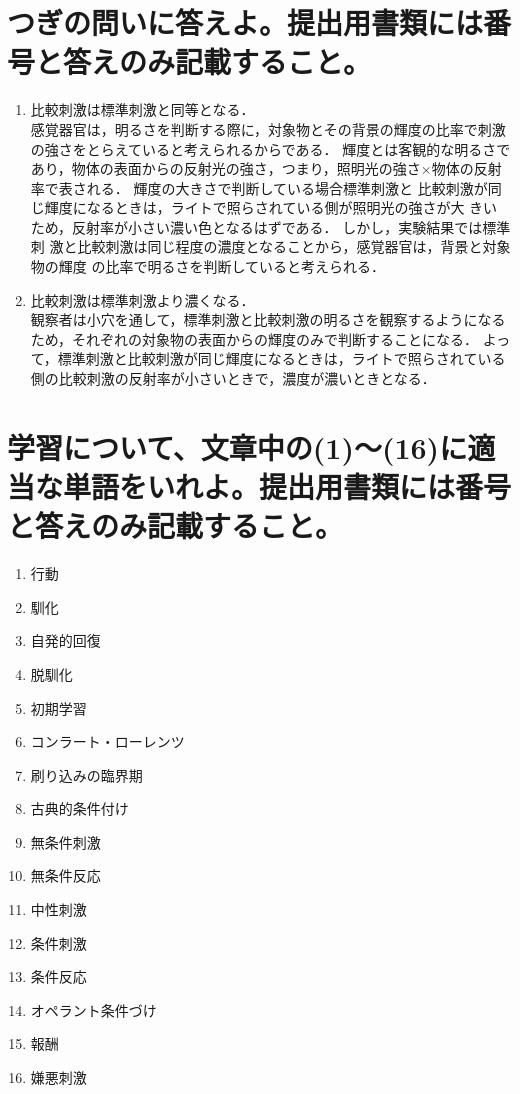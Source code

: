 \documentclass[titlepage,a4paper]{jsarticle}
\begin{document}
\section{つぎの問いに答えよ。提出用書類には番号と答えのみ記載すること。}%
\begin{enumerate}
  \item 比較刺激は標準刺激と同等となる． \\
        感覚器官は，明るさを判断する際に，対象物とその背景の輝度の比率で刺激の強さをとらえていると考えられるからである．
        輝度とは客観的な明るさであり，物体の表面からの反射光の強さ，つまり，照明光の強さ×物体の反射率で表される．
        輝度の大きさで判断している場合標準刺激と 比較刺激が同じ輝度になるときは，ライトで照らされている側が照明光の強さが大 きいため，反射率が小さい濃い色となるはずである．
        しかし，実験結果では標準刺 激と比較刺激は同じ程度の濃度となることから，感覚器官は，背景と対象物の輝度 の比率で明るさを判断していると考えられる．
  \item 比較刺激は標準刺激より濃くなる． \\
        観察者は小穴を通して，標準刺激と比較刺激の明るさを観察するようになるため，それぞれの対象物の表面からの輝度のみで判断することになる．
        よって，標準刺激と比較刺激が同じ輝度になるときは，ライトで照らされている側の比較刺激の反射率が小さいときで，濃度が濃いときとなる．
\end{enumerate}
\section{学習について、文章中の(1)〜(16)に適当な単語をいれよ。提出用書類には番号と答えのみ記載すること。}%
\begin{enumerate}
  \item 行動
  \item 馴化
  \item 自発的回復
  \item 脱馴化
  \item 初期学習
  \item コンラート・ローレンツ
  \item 刷り込みの臨界期
  \item 古典的条件付け
  \item 無条件刺激
  \item 無条件反応
  \item 中性刺激
  \item 条件刺激
  \item 条件反応
  \item オペラント条件づけ
  \item 報酬
  \item 嫌悪刺激
\end{enumerate}
\end{document}
